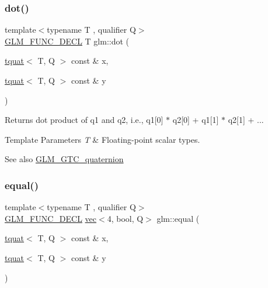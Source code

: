 \subsubsection{\texorpdfstring{dot()}{dot()}}
{\footnotesize\ttfamily template$<$typename T , qualifier Q$>$ \\
\hyperlink{setup_8hpp_ab2d052de21a70539923e9bcbf6e83a51}{G\+L\+M\+\_\+\+F\+U\+N\+C\+\_\+\+D\+E\+CL} T glm\+::dot (\begin{DoxyParamCaption}\item[{\hyperlink{structglm_1_1tquat}{tquat}$<$ T, Q $>$ const \&}]{x,  }\item[{\hyperlink{structglm_1_1tquat}{tquat}$<$ T, Q $>$ const \&}]{y }\end{DoxyParamCaption})}

Returns dot product of q1 and q2, i.\+e., q1\mbox{[}0\mbox{]} $\ast$ q2\mbox{[}0\mbox{]} + q1\mbox{[}1\mbox{]} $\ast$ q2\mbox{[}1\mbox{]} + ...


\begin{DoxyTemplParams}{Template Parameters}
{\em T} & Floating-\/point scalar types.\\
\hline
\end{DoxyTemplParams}
\begin{DoxySeeAlso}{See also}
\hyperlink{group__gtc__quaternion}{G\+L\+M\+\_\+\+G\+T\+C\+\_\+quaternion} 
\end{DoxySeeAlso}
\mbox{\label{group__gtc__quaternion_ga22089a76bfb7b45b4c34961bb715e2df}} 
\subsubsection{\texorpdfstring{equal()}{equal()}}
{\footnotesize\ttfamily template$<$typename T , qualifier Q$>$ \\
\hyperlink{setup_8hpp_ab2d052de21a70539923e9bcbf6e83a51}{G\+L\+M\+\_\+\+F\+U\+N\+C\+\_\+\+D\+E\+CL} \hyperlink{structglm_1_1vec}{vec}$<$4, bool, Q$>$ glm\+::equal (\begin{DoxyParamCaption}\item[{\hyperlink{structglm_1_1tquat}{tquat}$<$ T, Q $>$ const \&}]{x,  }\item[{\hyperlink{structglm_1_1tquat}{tquat}$<$ T, Q $>$ const \&}]{y }\end{DoxyParamCaption})}

